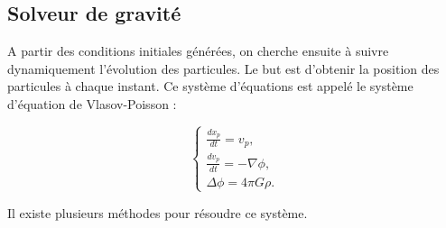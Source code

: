 


%
%

%
%

\subsection{Solveur de gravité}
\label{sec:gravity}


A partir des conditions initiales générées, on cherche ensuite à suivre dynamiquement l'évolution des particules.
Le but est d'obtenir la position des particules à chaque instant.
Ce système d'équations est appelé le système d'équation de Vlasov-Poisson :

\begin{equation}
\begin{cases}
\frac{d{x}_p}{dt} = { v}_p, \\
\frac{d{ v}_p}{dt} = -\nabla \phi , \\
\Delta \phi= 4\pi G \rho.
\end{cases}
\label{eq:Ncorps}
\end{equation}

Il existe plusieurs méthodes pour résoudre ce système.
